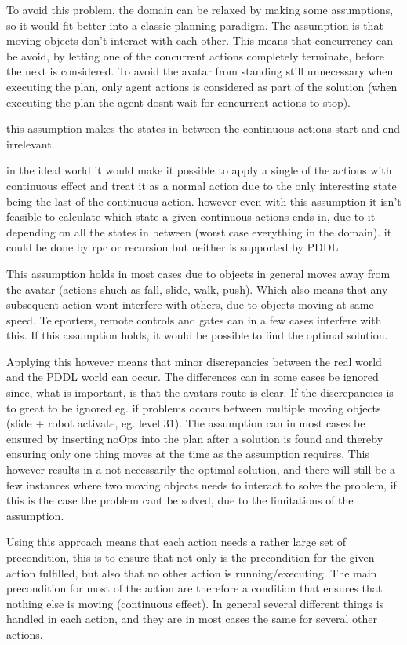 		To avoid this problem, the domain can be relaxed by making some assumptions, so it would fit better into a classic planning paradigm. The assumption is that moving objects don't interact with each other. This means that concurrency can be avoid, by letting one of the concurrent actions completely terminate, before the next is considered. To avoid the avatar from standing still unnecessary when executing the plan, only agent actions is considered as part of the solution (when executing the plan the agent dosnt wait for concurrent actions to stop).
		
		this assumption makes the states in-between the continuous actions start and end irrelevant.
		
		 in the ideal world it would make it possible to apply a single of the actions with continuous effect and treat it as a normal action due to the only interesting state being the last of the continuous action. however even with this assumption it isn't feasible to calculate which state a given continuous actions ends in, due to it depending on all the states in between (worst case everything in the domain). it could be done by rpc or recursion but neither is supported by PDDL
		
		
		This assumption holds in most cases due to objects in general moves away from the avatar (actions shuch as fall, slide, walk, push). Which also means that any subsequent action wont interfere with others, due to objects moving at same speed. Teleporters, remote controls and gates can in a few cases interfere with this. If this assumption holds, it would be possible to find the optimal solution.
		
		Applying this however means that minor discrepancies between the real world and the PDDL world can occur. The differences can in some cases be ignored since, what is important, is that the avatars route is clear. If the discrepancies is to great to be ignored eg. if problems occurs between multiple moving objects (slide + robot activate, eg. {\huge level 31}). The assumption can in most cases be ensured by inserting noOps into the plan after a solution is found and thereby ensuring only one thing moves at the time as the assumption requires. This however results in a not necessarily the optimal solution, and there will still be a few instances where two moving objects needs to interact to solve the problem, if this is the case the problem cant be solved, due to the limitations of the assumption.
			
		Using this approach means that each action needs a rather large set of precondition, this is to ensure that not only is the precondition for the given action fulfilled, but also that no other action is running/executing. The main precondition for most of the action are therefore a condition that ensures that nothing else is moving (continuous effect). In general several different things is handled in each action, and they are in most cases the same for several other actions. %
		
